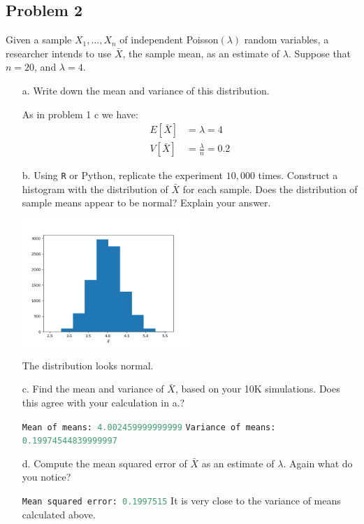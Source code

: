 \documentclass{article}
\newcommand{\1}{\mathbf{1}}
\begin{document}
\newpage
\subsection*{Problem 2}
Given a sample $X_1,\ldots , X_n$  of independent Poisson$(\lambda)$ random variables, a researcher  intends to use $\bar{X}$, the sample mean, as an estimate of $\lambda$.  Suppose that $n=20$, and $\lambda=4$.
\begin{itemize}
    \item[a.] Write down the mean and variance of this distribution.
    
    As in problem 1 c we have:
    \begin{align*}
        E[\bar X] &= \lambda = 4 \\
        V[\bar X] &= \frac{\lambda}{n} = 0.2
    \end{align*}
    
    \item[b.] Using {\tt R} or Python, replicate the experiment $10,000$ times. Construct a histogram with the distribution of $\bar{X}$ for each sample. Does the distribution of sample means appear to be normal? Explain your answer.
    
    \begin{center}
        \includegraphics[width=0.5\textwidth]{STATS509/HW7/HW7Figures/Problem2.png}
    \end{center}
    
    The distribution looks normal. 
    
    
    \item[c.] Find the mean and variance of $\bar{X}$, based on your 10K simulations. Does this agree with your calculation in a.?
    
    \lstinline[language=Python]{Mean of means: 4.002459999999999}\newline
    \lstinline[language=Python]{Variance of means: 0.19974544839999997}
    
    \item[d.] Compute the mean squared error of $\bar{X}$ as an estimate of $\lambda$. Again what do you notice? 
    
    \lstinline[language=Python]{Mean squared error: 0.1997515} \newline
    It is very close to the variance of means calculated above. 
\end{itemize}
\end{document}
